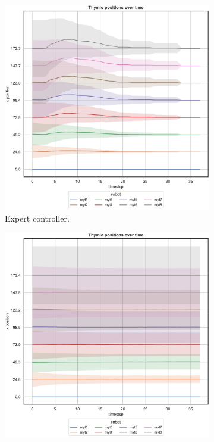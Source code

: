 \begin{figure}[!htb]
	\begin{center}
		\begin{subfigure}[h]{0.325\textwidth}
			\centering
			\includegraphics[width=\textwidth]{contents/images/net-d18/N8/position-overtime-omniscient}%
			\caption{Expert controller.}
		\end{subfigure}
		\hfill
		\begin{subfigure}[h]{0.325\textwidth}
			\centering
			\includegraphics[width=\textwidth]{contents/images/net-d18/N8/position-overtime-manual}%

\end{subfigure}
\end{center}
\end{figure}
